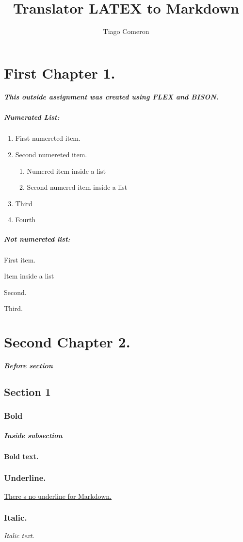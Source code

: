 \documentclass{report}
\title{Translator LATEX to Markdown}
\author{Tiago Comeron}
\begin{document}
\chapter{First Chapter 1.}
\paragraph{This outside assignment was created using FLEX and BISON.}
\paragraph{Numerated List:}
\begin{enumerate}
\item{First numereted item.}
\item{Second numereted item.}
\begin{enumerate}
\item{Numered item inside a list}
\item{Second numered item inside a list}
\end{enumerate}
\item{Third}
\item{Fourth}
\end{enumerate}
\paragraph{Not numereted list:}
\begin{itemsize}
\item{First item.}
\begin{itemsize}
\item{Item inside a list}
\end{itemsize}
\item{Second.}
\item{Third.}
\end{itemsize}
\paragraph{ }
\chapter{Second Chapter 2.}
\paragraph{Before section}
\section{Section 1}
\subsection{Bold}
\paragraph{Inside subsection}
\bf{Bold text.}
\subsection{Underline.}
\underline{There s no underline for Markdown.}
\subsection{Italic.}
\it{Italic text.}
\end{document}
